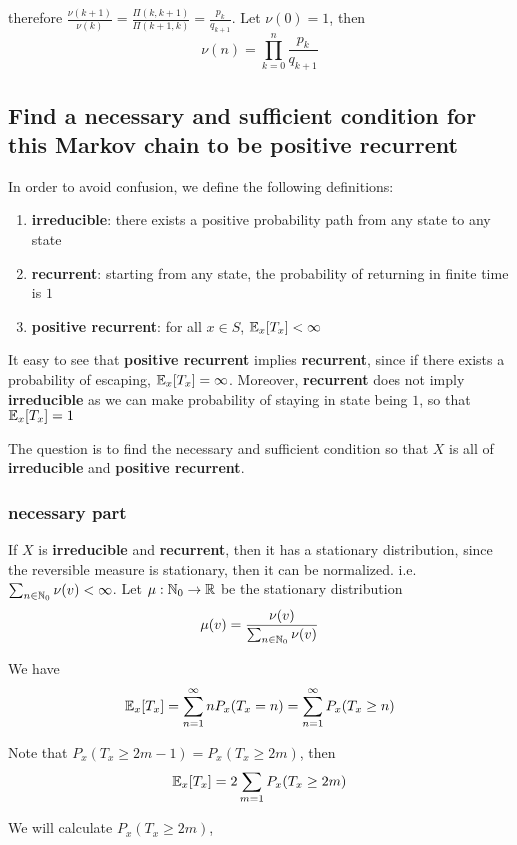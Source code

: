 \documentclass{article}
\begin{document}
therefore $\frac{\nu(k+1)}{\nu(k)} = \frac{\Pi(k, k+1)}{\Pi(k+1, k)} = \frac{p_k}{q_{k+1}}$. Let $\nu(0) = 1$, then
$$
    \nu(n) = \prod_{k=0}^n \frac{p_k}{q_{k+1}}
$$

\subsection{Find a necessary and sufficient condition for this Markov chain to be positive recurrent}

In order to avoid confusion, we define the following definitions: 
\begin{enumerate}
    \item \textbf{irreducible}: there exists a positive probability path from any state to any state
    \item \textbf{recurrent}: starting from any state, the probability of returning in finite time is $1$
    \item \textbf{positive recurrent}: for all $x \in S$, $\mathbb{E}_x[T_x] < \infty$
\end{enumerate}

It easy to see that \textbf{positive recurrent} implies \textbf{recurrent}, since if there exists a probability of escaping, $\mathbb{E}_x[T_x] = \infty$. Moreover, \textbf{recurrent} does not imply \textbf{irreducible} as we can make probability of staying in state being $1$, so that $\mathbb{E}_x[T_x] = 1$


The question is to find the necessary and sufficient condition so that $X$ is all of \textbf{irreducible} and \textbf{positive recurrent}.

\subsubsection{necessary part}

If $X$ is \textbf{irreducible} and \textbf{recurrent}, then it has a stationary distribution, since the reversible measure is stationary, then it can be normalized. i.e. $\sum_{n \in \mathbb{N}_0} \nu(v) < \infty$. Let $\mu: \mathbb{N}_0 \to \mathbb{R}$ be the stationary distribution
$$
    \mu(v) = \frac{\nu(v)}{\sum_{n \in \mathbb{N}_0} \nu(v)}
$$

We have
$$
\mathbb{E}_x[T_x]
    = \sum_{n=1}^\infty n P_x(T_x = n)
    = \sum_{n=1}^\infty P_x(T_x \geq n)
$$

Note that $P_x(T_x \geq 2m-1) = P_x(T_x \geq 2m)$, then 
$$
    \mathbb{E}_x[T_x] = 2 \sum_{m=1} P_x(T_x \geq 2m)
$$

We will calculate $P_x(T_x \geq 2m)$,
\end{document}
